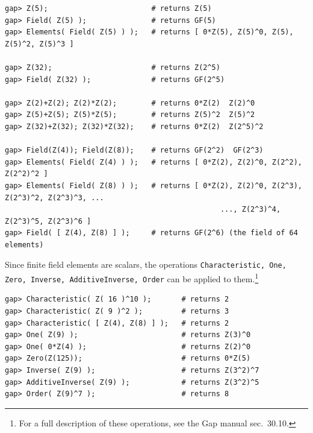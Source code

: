 \begin{itemize}
{\begin{verbatim}
gap> Z(5);                        # returns Z(5)
gap> Field( Z(5) );               # returns GF(5)
gap> Elements( Field( Z(5) ) );   # returns [ 0*Z(5), Z(5)^0, Z(5), Z(5)^2, Z(5)^3 ]

gap> Z(32);                       # returns Z(2^5)
gap> Field( Z(32) );              # returns GF(2^5)

gap> Z(2)+Z(2); Z(2)*Z(2);        # returns 0*Z(2)  Z(2)^0
gap> Z(5)+Z(5); Z(5)*Z(5);        # returns Z(5)^2  Z(5)^2
gap> Z(32)+Z(32); Z(32)*Z(32);    # returns 0*Z(2)  Z(2^5)^2

gap> Field(Z(4)); Field(Z(8));    # returns GF(2^2)  GF(2^3)
gap> Elements( Field( Z(4) ) );   # returns [ 0*Z(2), Z(2)^0, Z(2^2), Z(2^2)^2 ]
gap> Elements( Field( Z(8) ) );   # returns [ 0*Z(2), Z(2)^0, Z(2^3), Z(2^3)^2, Z(2^3)^3, ...
                                                  ..., Z(2^3)^4, Z(2^3)^5, Z(2^3)^6 ]
gap> Field( [ Z(4), Z(8) ] );     # returns GF(2^6) (the field of 64 elements)

\end{verbatim}}
\noindent Since finite field elements are scalars, the operations 
{\tt Characteristic, One, Zero, Inverse, AdditiveInverse, Order} 
can be applied to them.\footnote{For a full description of these operations, 
see the Gap manual \cite{gapmanual} sec.~30.10.} 
{\codesize
\begin{verbatim}
gap> Characteristic( Z( 16 )^10 );       # returns 2
gap> Characteristic( Z( 9 )^2 );         # returns 3
gap> Characteristic( [ Z(4), Z(8) ] );   # returns 2
gap> One( Z(9) );                        # returns Z(3)^0
gap> One( 0*Z(4) );                      # returns Z(2)^0
gap> Zero(Z(125));                       # returns 0*Z(5)
gap> Inverse( Z(9) );                    # returns Z(3^2)^7
gap> AdditiveInverse( Z(9) );            # returns Z(3^2)^5
gap> Order( Z(9)^7 );                    # returns 8

\end{verbatim}}
\end{itemize}


